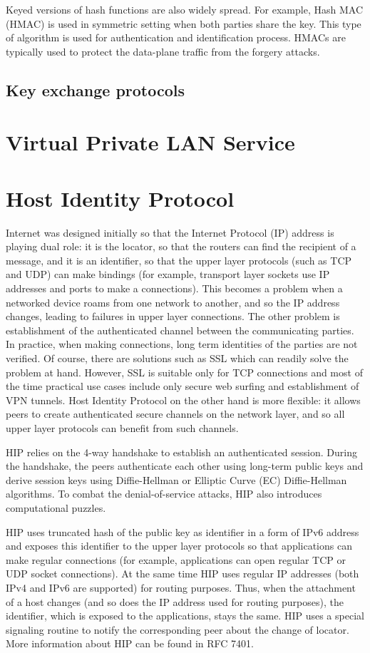 Keyed versions of hash functions are also widely spread. For example, Hash MAC (HMAC) is used
in symmetric setting when both parties share the key. This type of algorithm is used 
for authentication and identification process. HMACs are typically used to protect the 
data-plane traffic from the forgery attacks.

\subsection{Key exchange protocols}
\section{Virtual Private LAN Service}
\section{Host Identity Protocol}
Internet was designed initially so that the Internet Protocol (IP) address is playing 
dual role: it is the locator, so that the routers can find the recipient of a message, 
and it is an identifier, so that the upper layer protocols (such as TCP and UDP) can 
make bindings (for example, transport layer sockets use IP addresses and ports to make 
a connections). This becomes a problem when a networked device roams from one network 
to another, and so the IP address changes, leading to failures in upper layer connections. 
The other problem is establishment of the authenticated channel between the communicating 
parties. In practice, when making connections, long term identities of the parties are not 
verified. Of course, there are solutions such as SSL which can readily solve the problem 
at hand. However, SSL is suitable only for TCP connections and most of the time practical 
use cases include only secure web surfing and establishment of VPN tunnels. Host Identity 
Protocol on the other hand is more flexible: it allows peers to create authenticated secure 
channels on the network layer, and so all upper layer protocols can benefit from such channels.

HIP relies on the 4-way handshake to establish an authenticated session. During the handshake, 
the peers authenticate each other using long-term public keys and derive session keys using 
Diffie-Hellman or Elliptic Curve (EC) Diffie-Hellman algorithms. To combat the denial-of-service 
attacks, HIP also introduces computational puzzles.

HIP uses truncated hash of the public key as identifier in a form of IPv6 address and exposes 
this identifier to the upper layer protocols so that applications can make regular connections 
(for example, applications can open regular TCP or UDP socket connections). At the same time HIP 
uses regular IP addresses (both IPv4 and IPv6 are supported) for routing purposes. Thus, when 
the attachment of a host changes (and so does the IP address used for routing purposes), the 
identifier, which is exposed to the applications, stays the same. HIP uses a special signaling 
routine to notify the corresponding peer about the change of locator. More information about 
HIP can be found in RFC 7401.